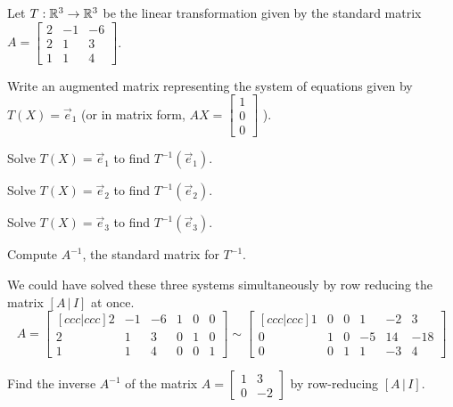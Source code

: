 \begin{applicationActivities}
\begin{activity}{20}
  Let \(T: \mathbb{R}^3 \rightarrow \mathbb{R}^3\) be the linear transformation given by the standard matrix
  \(A=\begin{bmatrix} 2 & -1 & -6 \\ 2 & 1 & 3 \\ 1 & 1 & 4 \end{bmatrix}\).
  \begin{subactivity}
  Write an augmented matrix representing the system of equations given by $T(X)=\vec{e}_1$ (or in matrix form, \(AX=\begin{bmatrix}1 \\ 0 \\ 0 \end{bmatrix}\) ).
  \end{subactivity}
  \begin{subactivity}
  Solve $T(X)=\vec{e}_1$ to find $T^{-1}(\vec{e}_1)$.
  \end{subactivity}
  \begin{subactivity}
   Solve $T(X)=\vec{e}_2$ to find $T^{-1}(\vec{e}_2)$.
  \end{subactivity}
  \begin{subactivity}
   Solve $T(X)=\vec{e}_3$ to find $T^{-1}(\vec{e}_3)$.
  \end{subactivity}
  \begin{subactivity}
  Compute $A^{-1}$, the standard matrix for $T^{-1}$.
  \end{subactivity}
\end{activity}

\begin{observation}
We could have solved these three systems simultaneously
by row reducing the matrix \([A\,|\,I]\) at once.
\[
  A=\begin{bmatrix}[ccc|ccc]
    2 & -1 & -6 & 1 & 0 & 0 \\
    2 & 1 & 3 & 0 & 1 & 0 \\
    1 & 1 & 4 & 0 & 0 & 1
  \end{bmatrix} \sim
  \begin{bmatrix}[ccc|ccc]
    1 & 0 & 0 & 1 & -2 & 3 \\
    0 & 1 & 0 & -5 & 14 & -18 \\
    0 & 0 & 1 & 1 & -3 & 4
  \end{bmatrix}
\]
\end{observation}


\begin{activity}{5}
  Find the inverse \(A^{-1}\) of the matrix
  \(A=\begin{bmatrix} 1 & 3 \\ 0 & -2 \end{bmatrix}\)
  by row-reducing \([A\,|\,I]\).
\end{activity}


\end{applicationActivities}
